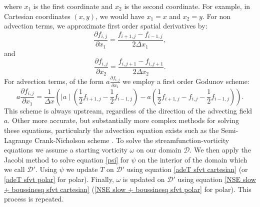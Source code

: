 \documentclass{article}
\begin{document}
where $x_1$ is the first coordinate and $x_2$ is the second coordinate. For example, in Cartesian coordinates $(x,y)$, we would have $x_1=x$ and $x_2=y$. 
For non advection terms, we approximate first order spatial derivatives by:
\begin{equation}
	\frac{\partial f_{i,j}}{\partial x_1} = \frac{f_{i+1,j} - f_{i-1,j}}{2{\Delta x_1}},
\end{equation}
and
\begin{equation}
	\frac{\partial f_{i,j}}{\partial x_2} = \frac{f_{i,j+1} - f_{i,j+1}}{2{\Delta x_2}}.
\end{equation}
For advection terms, of the form $a \frac{\partial f_{i,j}}{\partial x_1}$ we employ a first order Godunov scheme:
\begin{equation}
	a \frac{\partial f_{i,j}}{\partial x_1} = \frac{1}{\Delta x} ( \mid a\mid (  \frac{1}{2} f_{i+1,j} - \frac{1}{2} f_{i-1,j}   ) - a ( \frac{1}{2} f_{i+1,j} -f_{i,j} - \frac{1}{2} f_{i-1,j} )).
\end{equation}
This scheme is always upstream, regardless of the direction of the advecting field $a$.
\newline
Other more accurate, but substantially more complex methods for solving these equations, particularly the advection equation exists such as the Semi-Lagrange Crank-Nicholson scheme \cite{spiegelman2006semi}.
\newline
To solve the streamfunction-vorticity equations we assume a starting vorticity $\omega$ on our domain $\mathcal{D}$. We then apply the Jacobi method to solve equation \ref{psi} for $\psi$ on the interior of the domain which we call $\mathcal{D}'$. 
Using $\psi$ we update $T$ on $\mathcal{D}'$ using equation \ref{adeT sfvt cartesian} (or \ref{adeT sfvt polar} for polar). Finally, $\omega$ is updated on $\mathcal{D}'$ using 
equation \ref{NSE slow + boussinesq sfvt cartesian} (\ref{NSE slow + boussinesq sfvt polar} for polar). This process is repeated.
\end{document}
